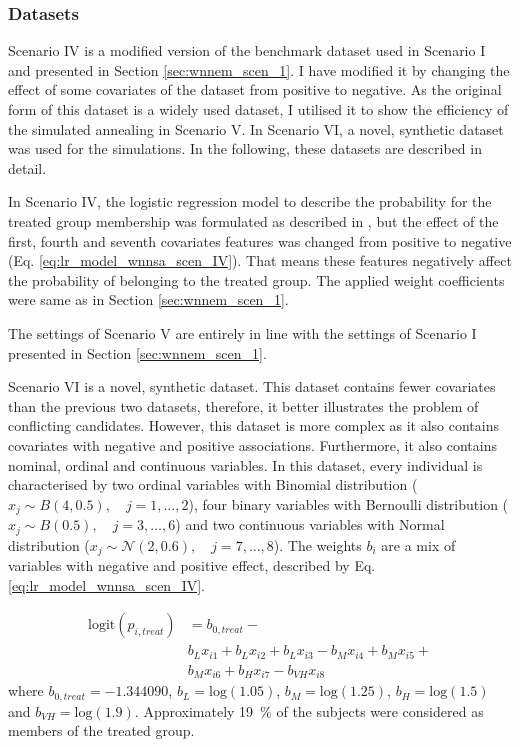 		\subsubsection{Datasets}
		\label{sec:datasets_wnnsa}
								
		Scenario IV is a modified version of the benchmark dataset used in Scenario I and presented in Section \ref{sec:wnnem_scen_1}. I have modified it by changing the effect of some covariates of the dataset from positive to negative. As the original form of this dataset is a widely used dataset, I utilised it to show the efficiency of the simulated annealing in Scenario V. In Scenario VI, a novel, synthetic dataset was used for the simulations. In the following, these datasets are described in detail. 
								
		In Scenario IV, the logistic regression model to describe the probability for the treated group membership was formulated as described in \cite{austin2011comparing}, but the effect of the first, fourth and seventh covariates features was changed from positive to negative (Eq. \ref{eq:lr_model_wnnsa_scen_IV}). That means these features negatively affect the probability of belonging to the treated group. The applied weight coefficients were same as in Section \ref{sec:wnnem_scen_1}.
								
		The settings of Scenario V are entirely in line with the settings of Scenario I presented in Section \ref{sec:wnnem_scen_1}.   
								
		Scenario VI is a novel, synthetic dataset. This dataset contains fewer covariates than the previous two datasets, therefore, it better illustrates the problem of conflicting candidates. However, this dataset is more complex as it also contains covariates with negative and positive associations. Furthermore, it also contains nominal, ordinal and continuous variables. In this dataset, every individual is characterised by two ordinal variables with Binomial distribution ($x_j\sim B(4,0.5), \quad j=1,\dots,2$), four binary variables with Bernoulli distribution ($x_j\sim B(0.5), \quad j=3,\dots,6$) and two continuous variables with Normal distribution ($x_j\sim \mathcal{N}(2, 0.6), \quad j=7,\dots,8$). The weights $b_i$ are a mix of variables with negative and positive effect, described by Eq. \ref{eq:lr_model_wnnsa_scen_IV}.
								
		\begin{equation}
			\label{eq:lr_model_wnnsa_scen_IV}
			\begin{split}
				\textrm{logit}(p_{i,treat}) &= b_{0,treat} - \\
				& b_L x_{i1} + b_L x_{i2} + b_L x_{i3} - b_M x_{i4} + b_M x_{i5} +  \\
				& b_M x_{i6} + b_H x_{i7} - b_{VH} x_{i8}
			\end{split}
		\end{equation}  
		where $b_{0,treat}=-1.344090$, $b_L=\textrm{log}(1.05)$, $b_M=\textrm{log}(1.25)$, $b_H=\textrm{log}(1.5)$ and $b_{VH}=\textrm{log}(1.9)$. Approximately \SI{19}{\percent} of the subjects were considered as members of the treated group.
								
